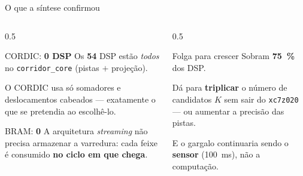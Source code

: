\documentclass[aspectratio=169, 11pt]{beamer}
\begin{document}
\begin{frame}{O que a síntese confirmou}
\begin{columns}[T]
\begin{column}{0.5\textwidth}
\begin{exampleblock}{CORDIC: \textbf{0 DSP}}
\footnotesize
Os \textbf{54} DSP estão \emph{todos} no \texttt{corridor\_core} (pistas $+$
projeção).

\vspace{1mm}
O CORDIC usa só somadores e deslocamentos cabeados --- exatamente o que se
pretendia ao escolhê-lo.
\end{exampleblock}

\begin{exampleblock}{BRAM: \textbf{0}}
\footnotesize
A arquitetura \emph{streaming} não precisa armazenar a varredura: cada feixe é
consumido \textbf{no ciclo em que chega}.
\end{exampleblock}
\end{column}
\begin{column}{0.5\textwidth}
\begin{block}{Folga para crescer}
\footnotesize
Sobram \textbf{\SI{75}{\percent}} dos DSP.

\vspace{2mm}
Dá para \textbf{triplicar} o número de candidatos $K$ sem sair do
\texttt{xc7z020} --- ou aumentar a precisão das pistas.

\vspace{2mm}
E o gargalo continuaria sendo o \textbf{sensor} (\SI{100}{\milli\second}), não a
computação.
\end{block}

\end{column}
\end{columns}
\end{frame}
\end{document}

